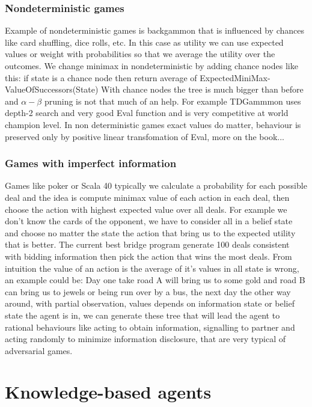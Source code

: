 \documentclass[12pt]{book}
\begin{document}
\subsection{Nondeterministic games}
Example of nondeterministic games is backgammon that is influenced by chances like card shuffling, dice rolls, etc. 
In this case as utility we can use expected values or weight with probabilities so that we average the utility over the outcomes.
\newline
We change minimax in nondeterministic by adding chance nodes like this: 
\newline
if state is a chance node then return average of ExpectedMiniMax-ValueOfSuccessors(State)
\newline
With chance nodes the tree is much bigger than before and $\alpha-\beta$ pruning is not that much of an help. For example TDGammmon uses depth-2 search and very good Eval function and is very competitive at world champion level.
In non deterministic games exact values do matter, behaviour is preserved only by positive linear transfomation of Eval, more on the book...

\subsection{Games with imperfect information}
Games like poker or Scala 40 typically we calculate a probability for each possible deal and the idea is compute minimax value of each action in each deal, then choose the action with highest expected value over all deals.
For example we don't know the cards of the opponent, we have to consider all in a belief state and choose no matter the state the action that bring us to the expected utility that is better.
The current best bridge program generate 100 deals consistent with bidding information then pick the action that wins the most deals.
From intuition the value of an action is the average of it's values in all state is wrong, an example could be:
\newline
Day one take road A will bring us to some gold and road B can bring us to jewels or being run over by a bus, the next day the other way around, with partial observation, values depends on information state or belief state the agent is in, we can generate these tree that will lead the agent to rational behaviours like acting to obtain information, signalling to partner and acting randomly to minimize information disclosure, that are very typical of adversarial games. 

\chapter{Knowledge-based agents}
\end{document}
